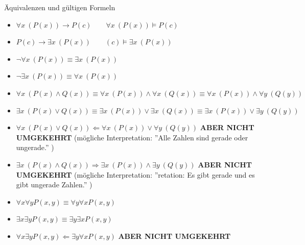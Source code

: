 \begin{bsp*}{Äquivalenzen und gültigen Formeln}
	\begin{itemize}
		\item $\forall x~( P( x ) ) \rightarrow P( c ) \qquad \forall x~( P( x ) ) \models P( c )$
		\item $P( c ) \rightarrow \exists x~( P( x ) ) \qquad ( c ) \models \exists x~( P( x ) )$
		\item $\neg \forall x~( P( x ) ) \equiv \exists x~( P( x ) )$
		\item $\neg \exists x~( P( x ) ) \equiv \forall x~( P( x ) )$
		\item $\forall x~( P( x ) \wedge Q( x ) ) \equiv \forall x~( P( x ) ) \wedge \forall x~( Q( x ) ) \equiv \forall x~( P( x ) ) \wedge \forall y~( Q( y ) )$
		\item $\exists x~( P( x ) \vee Q( x ) ) \equiv \exists x~( P( x ) ) \vee \exists x~( Q( x ) ) \equiv \exists x~( P( x ) ) \vee \exists y~( Q( y ) )$
		\item $\forall x~( P( x ) \vee Q( x ) ) \Leftarrow \forall x~( P( x ) ) \vee \forall y~( Q( y ) )$  \quad \textbf{ABER NICHT UMGEKEHRT} (mögliche Interpretation: ''Alle Zahlen sind gerade oder ungerade.'' )
		\item $\exists x~( P( x ) \wedge Q( x ) ) \Rightarrow \exists x~( P( x ) ) \wedge \exists y~( Q( y ) )$  \quad \textbf{ABER NICHT UMGEKEHRT} (mögliche Interpretation: ''retation: Es gibt gerade und es gibt ungerade Zahlen.'' )
		\item $\forall x \forall y P( x , y ) \equiv \forall y \forall x P( x , y )$
		\item $\exists x \exists y P( x , y ) \equiv \exists y \exists x P( x , y )$
		\item $\forall x \exists y P( x , y ) \Leftarrow \exists y \forall x P( x , y )$ \quad \textbf{ABER NICHT UMGEKEHRT}
	\end{itemize}
\end{bsp*}

